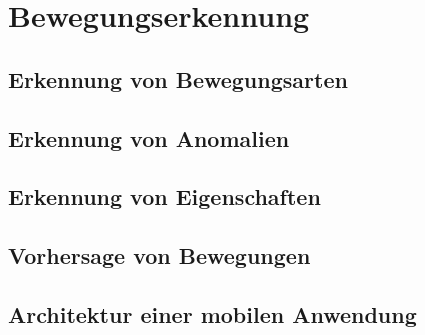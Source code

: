 \chapter{Bewegungserkennung}\label{chapter:motion-detection}
\section{Erkennung von Bewegungsarten}
\section{Erkennung von Anomalien}
\section{Erkennung von Eigenschaften}
\section{Vorhersage von Bewegungen}
\section{Architektur einer mobilen Anwendung}